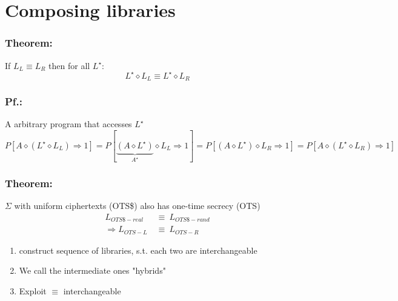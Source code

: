 \documentclass{report}
\begin{document}
\chapter*{Composing libraries}
\subsection*{Theorem:}
If $L_L \equiv L_R$ then for all $L^{\star}$: \\
\[
	L^{\star} \diamond L_L \equiv L^{\star} \diamond L_R
\]
\subsection*{Pf.:}
A arbitrary program that accesses $L^{\star}$
\[
	P[A \diamond (L^{\star} \diamond L_L) \Rightarrow 1] = P[\underbrace{(A \diamond L^{\star})}_{A^{\star}} \diamond L_L \Rightarrow 1] = P[{(A \diamond L^{\star})} \diamond L_R \Rightarrow 1] = P[A \diamond (L^{\star} \diamond L_R) \Rightarrow 1]
\]
\subsection*{Theorem:}
$\Sigma$ with uniform ciphertexts (OTS\$) also has one-time secrecy (OTS)
\begin{align*}
	L_{OTS\$-real} \ & \equiv \ L_{OTS\$-rand} \\
	\Rightarrow L_{OTS-L} \ & \equiv \ L_{OTS-R}
\end{align*}
\begin{enumerate}[$\bullet$]
	\item construct sequence of libraries, s.t. each two are interchangeable
	\item We call the intermediate ones "hybrids"
	\item Exploit $\equiv$ interchangeable
\end{enumerate}
\newpage
\end{document}
